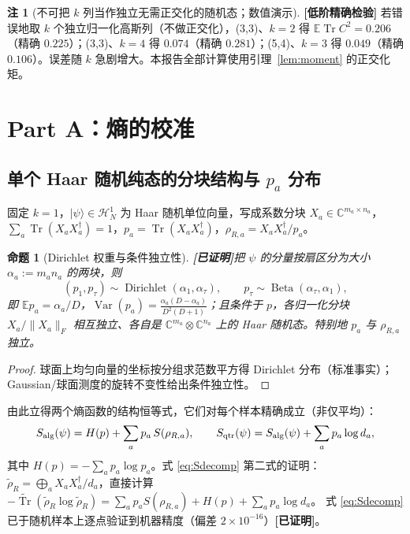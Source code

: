 \documentclass[11pt,a4paper]{ctexart}
\newtheorem{proposition}{命题}
\theoremstyle{definition}
\newtheorem{remark}{注}
\newcommand{\proved}{\textcolor{green!45!black}{\textbf{[已证明]}}}
\newcommand{\loword}{\textcolor{orange!80!black}{\textbf{[低阶精确检验]}}}
\newcommand{\Tr}{\operatorname{Tr}}
\newcommand{\TrT}{\widetilde{\Tr}}
\newcommand{\E}{\mathbb{E}}
\newcommand{\C}{\mathbb{C}}
\newcommand{\Nalg}{S_{\rm alg}}
\newcommand{\Nqtr}{S_{\rm qtr}}
\begin{document}
\begin{remark}[不可把 $k$ 列当作独立无需正交化的随机态；数值演示]\label{rem:naive}
\loword{} 若错误地取 $k$ 个独立归一化高斯列（不做正交化），(3,3)、$k=2$ 得 $\E\Tr C^2=0.206$（精确 $0.225$）；(3,3)、$k=4$ 得 $0.074$（精确 $0.281$）；(5,4)、$k=3$ 得 $0.049$（精确 $0.106$）。误差随 $k$ 急剧增大。本报告全部计算使用引理~\ref{lem:moment} 的正交化矩。
\end{remark}

\section{Part A：熵的校准}
\label{sec:partA}

\subsection{单个 Haar 随机纯态的分块结构与 $p_a$ 分布}

固定 $k=1$，$|\psi\rangle\in\mathcal H_N^1$ 为 Haar 随机单位向量，写成系数分块 $X_a\in\C^{m_a\times n_a}$，$\sum_a\Tr(X_aX_a^\dagger)=1$，$p_a=\Tr(X_aX_a^\dagger)$，$\rho_{R,a}=X_aX_a^\dagger/p_a$。

\begin{proposition}[Dirichlet 权重与条件独立性]\proved{}\label{prop:dirichlet}
把 $\psi$ 的分量按扇区分为大小 $\alpha_a:=m_an_a$ 的两块，则
\[
(p_1,p_\tau)\sim\operatorname{Dirichlet}(\alpha_1,\alpha_\tau),\qquad
p_\tau\sim\operatorname{Beta}(\alpha_\tau,\alpha_1),
\]
即 $\E p_a=\alpha_a/D$，$\operatorname{Var}(p_a)=\frac{\alpha_a(D-\alpha_a)}{D^2(D+1)}$；且条件于 $p$，各归一化分块 $X_a/\|X_a\|_F$ 相互独立、各自是 $\C^{m_a}\otimes\C^{n_a}$ 上的 Haar 随机态。特别地 $p_a$ 与 $\rho_{R,a}$ 独立。
\end{proposition}
\begin{proof}
球面上均匀向量的坐标按分组求范数平方得 Dirichlet 分布（标准事实）；Gaussian/球面测度的旋转不变性给出条件独立性。
\end{proof}

由此立得两个熵函数的结构恒等式，它们对每个样本精确成立（非仅平均）：
\begin{equation}\label{eq:Sdecomp}
\Nalg(\psi)=H(p)+\sum_a p_a\,S(\rho_{R,a}),\qquad
\Nqtr(\psi)=\Nalg(\psi)+\sum_a p_a\log d_a ,
\end{equation}
其中 $H(p)=-\sum_ap_a\log p_a$。式 \eqref{eq:Sdecomp} 第二式的证明：$\widetilde\rho_R=\bigoplus_aX_aX_a^\dagger/d_a$，直接计算
$-\TrT(\widetilde\rho_R\log\widetilde\rho_R)=\sum_a p_aS(\rho_{R,a})+H(p)+\sum_ap_a\log d_a$。
式 \eqref{eq:Sdecomp} 已于随机样本上逐点验证到机器精度（偏差 $2\times10^{-16}$）\proved{}。
\end{document}
